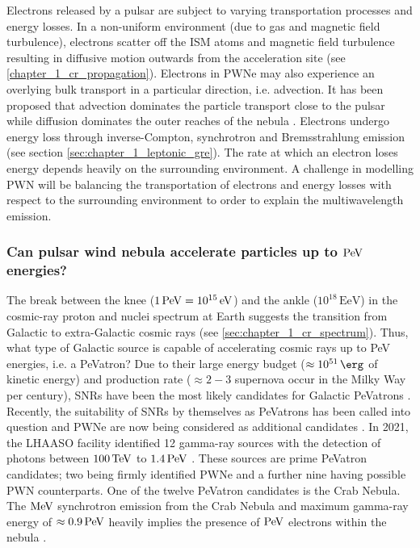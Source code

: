 Electrons released by a pulsar are subject to varying transportation processes and energy losses. In a non-uniform environment (due to gas and magnetic field turbulence), electrons scatter off the ISM atoms and magnetic field turbulence resulting in diffusive motion outwards from the acceleration site (see \autoref{chapter_1_cr_propagation}). Electrons in PWNe may also experience an overlying bulk transport in a particular direction, i.e. advection. It has been proposed that advection dominates the particle transport close to the pulsar while diffusion dominates the outer reaches of the nebula \citep{2020A&A...636A.113G, 2021PhRvD.104l3017R}. Electrons undergo energy loss through inverse-Compton, synchrotron and Bremsstrahlung emission (see section \autoref{sec:chapter_1_leptonic_gre}). The rate at which an electron loses energy depends heavily on the surrounding environment.
\newpar
A challenge in modelling PWN will be balancing the transportation of electrons and energy losses with respect to the surrounding environment to order to explain the multiwavelength emission.

\subsubsection{Can pulsar wind nebula accelerate particles up to $\PeV$ energies?}

The break between the knee ($1\,\PeV=10^{15}\,\eV$) and the ankle ($10^{18}\,\si{\exa\electronvolt}$) in the cosmic-ray proton and nuclei spectrum at Earth suggests the transition from Galactic to extra-Galactic cosmic rays (see \autoref{sec:chapter_1_cr_spectrum}). Thus, what type of Galactic source is capable of accelerating cosmic rays up to PeV energies, i.e. a PeVatron?
\newpar
Due to their large energy budget ($\approx 10^{51}\,\ergs$ of kinetic energy) and production rate ($\approx 2-3$ supernova occur in the Milky Way per century), SNRs have been the most likely candidates for Galactic PeVatrons \citep{1983A&A...125..249L, 1984ARA&A..22..425H,2004MNRAS.353..550B,10.1093/mnras/sty1589}. Recently, the suitability of SNRs by themselves as PeVatrons has been called into question \citep{CRISTOFARI2020102492} and PWNe are now being considered as additional candidates \citep{2018MNRAS.478..926O, Xin_2019, de_O_a_Wilhelmi_2022,2022A&A...660A...8B}.
\newpar
In 2021, the LHAASO facility identified 12 gamma-ray sources with the detection of photons between $100\,\TeV$ to $1.4\,\PeV$ \citep{2021Natur.594...33C}. These sources are prime PeVatron candidates; two being firmly identified PWNe and a further nine having possible PWN counterparts. One of the twelve PeVatron candidates is the Crab Nebula. The $\si{\mega\electronvolt}$ synchrotron emission from the Crab Nebula and maximum gamma-ray energy of $\approx 0.9\,\PeV$ heavily implies the presence of $\PeV$ electrons within the nebula \citep{doi:10.1126/science.abg5137}.

